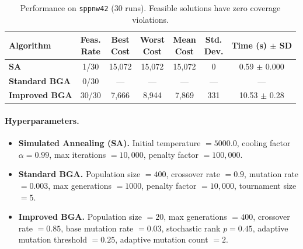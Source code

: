 \documentclass[12pt]{article}
\begin{document}
\begin{table}[htbp]
  \centering
  \label{tab:sppnw42}
  \renewcommand{\arraystretch}{1.1}
  \begin{tabular}{lcccccc}
    \hline
    \textbf{Algorithm} 
      & \makecell{Feas.\\Rate} 
      & \makecell{Best\\Cost} 
      & \makecell{Worst\\Cost} 
      & \makecell{Mean\\Cost} 
      & \makecell{Std.\\Dev.} 
      & \makecell{Time\\(s) $\pm$ SD}\\
    \hline
    \textbf{SA}          
      & 1/30 
      & 15,072
      & 15,072
      & 15,072
      & 0
      & 0.59 $\pm$ 0.000 \\
    \textbf{Standard BGA} 
      & 0/30
      & — 
      & —
      & —
      & —
      & — \\
    \textbf{Improved BGA} 
      & 30/30 
      & 7,666
      & 8,944
      & 7,869
      & 331
      & 10.53 $\pm$ 0.28 \\
    \hline
  \end{tabular}
  \caption{Performance on \texttt{sppnw42} (30 runs). Feasible solutions have zero coverage violations.}
\end{table}

\paragraph{Hyperparameters.}
\vspace{-1em}
\begin{itemize}
    \item \textbf{Simulated Annealing (SA).} 
    Initial temperature $= 5000.0$, 
    cooling factor $\alpha = 0.99$, 
    max iterations $= 10{,}000$, 
    penalty factor $= 100{,}000$. 
    \item \textbf{Standard BGA.}
    Population size $= 400$, 
    crossover rate $= 0.9$, 
    mutation rate $= 0.003$, 
    max generations $= 1000$, 
    penalty factor $= 10{,}000$, 
    tournament size $= 5$. 
    \item \textbf{Improved BGA.}
    Population size $= 20$, 
    max generations $= 400$, 
    crossover rate $= 0.85$, 
    base mutation rate $= 0.03$, 
    stochastic rank $p = 0.45$, 
    adaptive mutation threshold $= 0.25$, 
    adaptive mutation count $= 2$.
\end{itemize}
\end{document}
